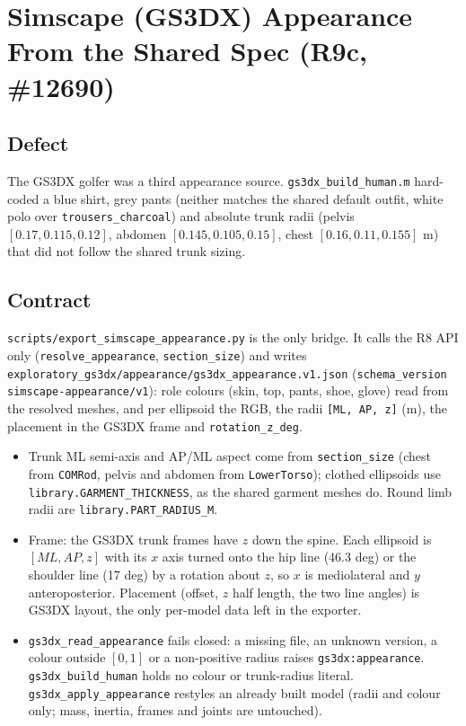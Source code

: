 \section{Simscape (GS3DX) Appearance From the Shared Spec (R9c, \#12690)}

\subsection{Defect}
The GS3DX golfer was a third appearance source. \texttt{gs3dx\_build\_human.m}
hard-coded a blue shirt, grey pants (neither matches the shared default outfit,
white polo over \texttt{trousers\_charcoal}) and absolute trunk radii
(pelvis $[0.17, 0.115, 0.12]$, abdomen $[0.145, 0.105, 0.15]$, chest
$[0.16, 0.11, 0.155]$ m) that did not follow the shared trunk sizing.

\subsection{Contract}
\texttt{scripts/export\_simscape\_appearance.py} is the only bridge. It calls
the R8 API only (\texttt{resolve\_appearance}, \texttt{section\_size}) and
writes \texttt{exploratory\_gs3dx/appearance/gs3dx\_appearance.v1.json}
(\texttt{schema\_version} \texttt{simscape-appearance/v1}):
role colours (skin, top, pants, shoe, glove) read from the resolved meshes, and
per ellipsoid the RGB, the radii \texttt{[ML, AP, z]} (m), the placement in the
GS3DX frame and \texttt{rotation\_z\_deg}.

\begin{itemize}
\item Trunk ML semi-axis and AP/ML aspect come from \texttt{section\_size}
  (chest from \texttt{COMRod}, pelvis and abdomen from \texttt{LowerTorso});
  clothed ellipsoids use \texttt{library.GARMENT\_THICKNESS}, as the shared
  garment meshes do. Round limb radii are \texttt{library.PART\_RADIUS\_M}.
\item Frame: the GS3DX trunk frames have $z$ down the spine. Each ellipsoid is
  $[ML, AP, z]$ with its $x$ axis turned onto the hip line (46.3 deg) or the
  shoulder line (17 deg) by a rotation about $z$, so $x$ is mediolateral and
  $y$ anteroposterior. Placement (offset, $z$ half length, the two line
  angles) is GS3DX layout, the only per-model data left in the exporter.
\item \texttt{gs3dx\_read\_appearance} fails closed: a missing file, an unknown
  version, a colour outside $[0,1]$ or a non-positive radius raises
  \texttt{gs3dx:appearance}. \texttt{gs3dx\_build\_human} holds no colour or
  trunk-radius literal. \texttt{gs3dx\_apply\_appearance} restyles an already
  built model (radii and colour only; mass, inertia, frames and joints are
  untouched).
\end{itemize}

